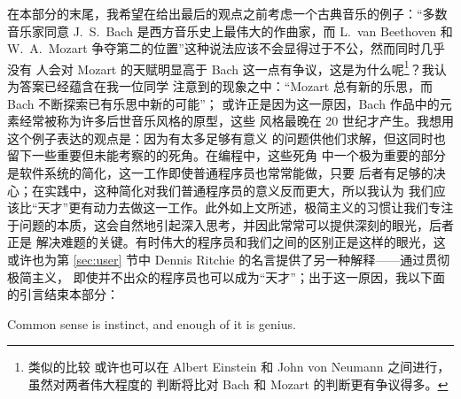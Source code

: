 在本部分的末尾，我希望在给出最后的观点之前考虑一个古典音乐的例子：“多数
音乐家同意 J.~S.\ Bach 是西方音乐史上最伟大的作曲家，而 L.\ van Beethoven
和 W.~A.\ Mozart 争夺第二的位置”这种说法应该不会显得过于不公，然而同时几乎没有
人会对 Mozart 的天赋明显高于 Bach 这一点有争议，这是为什么呢\footnote{类似的比较
或许也可以在 Albert Einstein 和 John von Neumann 之间进行，虽然对两者伟大程度的
判断将比对 Bach 和 Mozart 的判断更有争议得多。}？我认为答案已经蕴含在我一位同学
注意到的现象之中：“Mozart 总有新的乐思，而 Bach 不断探索已有乐思中新的可能”；
或许正是因为这一原因，Bach 作品中的元素经常被称为许多后世音乐风格的原型，这些
风格最晚在 20 世纪才产生。我想用这个例子表达的观点是：因为有太多足够有意义
的问题供他们求解，但这同时也留下一些重要但未能考察的的死角。在编程中，这些死角
中一个极为重要的部分是软件系统的简化，这一工作即使普通程序员也常常能做，只要
后者有足够的决心；在实践中，这种简化对我们普通程序员的意义反而更大，所以我认为
我们应该比“天才”更有动力去做这一工作。此外如上文所述，极简主义的习惯让我们专注
于问题的本质，这会自然地引起深入思考，并因此常常可以提供深刻的眼光，后者正是
解决难题的关键。有时伟大的程序员和我们之间的区别正是这样的眼光，这或许也为第
\ref{sec:user} 节中 Dennis Ritchie 的名言提供了另一种解释——通过贯彻极简主义，
即使并不出众的程序员也可以成为“天才”；出于这一原因，我以下面的引言结束本部分：
\begin{quoting}
	Common sense is instinct, and enough of it is genius.
\end{quoting}

